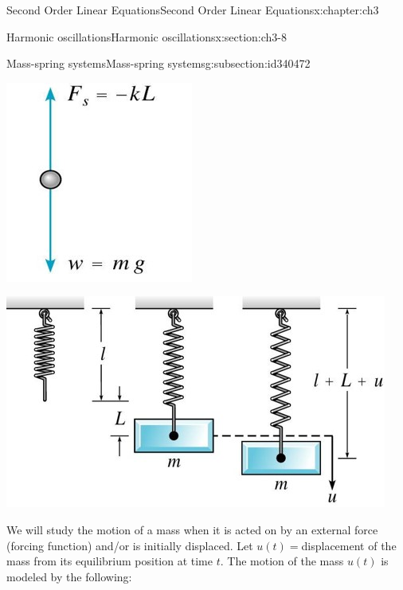 \documentclass[oneside,10pt,]{book}
\numberwithin{equation}{section}
\numberwithin{equation}{section}
\begin{document}
\begin{chapterptx}{Second Order Linear Equations}{}{Second Order Linear Equations}{}{}{x:chapter:ch3}
\begin{sectionptx}{Harmonic oscillations}{}{Harmonic oscillations}{}{}{x:section:ch3-8}
\begin{subsectionptx}{Mass-spring systems}{}{Mass-spring systems}{}{}{g:subsection:id340472}
\begin{sidebyside}{2}{0}{0}{0}
\begin{sbspanel}{0.5}
\includegraphics[width=\linewidth]{images/Spring1.jpg}
\end{sbspanel}%
\begin{sbspanel}{0.5}%
\includegraphics[width=\linewidth]{images/Spring2.jpg}
\end{sbspanel}%
\end{sidebyside}%
%
\par
We will study the motion of a mass when it is acted on by an external force (forcing function) and\slash{}or is initially displaced. Let \(u(t)=\)displacement of the mass from its equilibrium position at time \(t\). The motion of the mass \(u(t)\) is modeled by the following:%

\end{subsectionptx}
\end{sectionptx}
\end{chapterptx}
\end{document}
